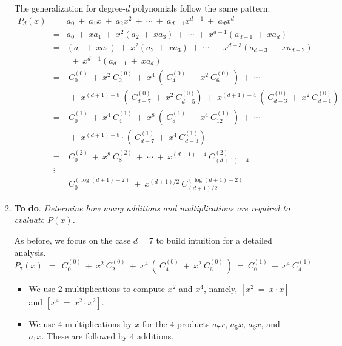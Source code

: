 \begin{itemize}
\begin{enumerate}
\smallskip

The generalization for degree-$d$ polynomials follow the same pattern:
\begin{eqnarray*}
P_d(x) & = & a_0 \ + \ a_1 x \ + \ a_2 x^2 \ +  \ \cdots \ + \ a_{d-1} x^{d-1} \ + \ a_{d} x^{d} \\
           & = & a_0 \ + \ x a_1 \ + \ x^2 (a_2  \ + \ x a_3) \  +  \ \cdots \ + \ x^{d-1} (a_{d-1}  \ + \ x  a_{d})\\
           & = & (a_0 \ + \ x a_1) \ + \ x^2 (a_2  \ + \ x a_3) \ + \ \cdots \ + \ x^{d-3} (a_{d-3} \ + \ x  a_{d-2}) \\
           & & \ \ + \ x^{d-1} (a_{d-1}  \ + \ x  a_{d}) \\
           & = & \ C_{0}^{(0)} \ + \ x^2 \ C_2^{(0)} \ + \ x^4 \ ( \ C_4^{(0)} \ + \ x^2 \ C_{6}^{(0)} \ )  \ + \ \cdots \\
           &  & \ + \ x^{(d+1)-8} \ (\ C_{d-7}^{(0)} \ + \ x^2 \ C_{d-5}^{(0)}) \ + \ x^{(d+1)-4} \ ( \ C_{d-3}^{(0)} \ + \ x^2 \ C_{d-1}^{(0)} ) \\
          & = & \ C_{0}^{(1)} \ + \ x^4 \ C_4^{(1)} \ + \ x^8 \ ( \ C_8^{(1)} \ + \ x^4 \ C_{12}^{(1)} \ )  \ + \ \cdots \\
          &  &  \ + \ x^{(d+1)-8} \cdot ( \ C_{d-7}^{(1)} \ + \ x^4 \ C_{d-3}^{(1)} ) \\
         & = & \ C_{0}^{(2)} \ + \ x^8 \ C_8^{(2)}  \ + \ \cdots \ + \ x^{(d+1)-4} \ C_{(d+1)-4}^{(2)} \\
         & \vdots &  \\
         & = & \ C_0^{(\log (d+1)-2)} \ + \ x^{(d+1)/2} \ C_{(d+1)/2}^{(\log (d+1)-2)} 
\end{eqnarray*}

\medskip
\item
{\bf To do}.
{\em Determine how many additions and multiplications are required to evaluate $P(x)$.}

\smallskip

As before, we focus on the case $d=7$ to build intuition for a detailed analysis. 
\[
P_7(x) \ \ = \ \ C_{0}^{(0)} \ + \ x^2 \ C_2^{(0)} \ + 
\ x^4 \ ( \ C_4^{(0)} \ + \ x^2 \ C_6^{(0)} \ )
\ = \ C_0^{(1)} \ + \ x^4 \ C_4^{(1)} 
\]
\begin{itemize}
\item
We use $2$ multiplications to compute $x^2$ and $x^4$, namely,
$[x^2 \ = \ x \cdot x]$ and $[x^4 \ = \ x^2 \cdot x^2]$.

\medskip\item
We use $4$ multiplications by $x$ for the $4$ products $a_7 x$,  $a_5 x$, $a_3 x$, and $a_1  x$.  These are followed by $4$ additions.


\end{itemize}
\end{enumerate}
\end{itemize}
